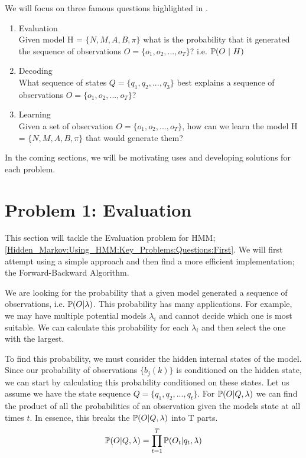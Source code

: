     We will focus on three famous questions highlighted in  \cite{Rabiner1986}. 
    \begin{enumerate}
        \label{Hidden_Markov:Using_HMM:Key_Problems:Questions}
        \item \label{Hidden_Markov:Using_HMM:Key_Problems:Questions:First} Evaluation \\ Given model H = $\{N,M,A,B, \pi\}$ what is the probability that it generated the sequence of observations $O = \{o_1,o_2,...,o_T\}$? i.e. $\mathbb{P} (O \ | \ H)$
        \item \label{Hidden_Markov:Using_HMM:Key_Problems:Questions:Second} Decoding \\ What sequence of states $Q = \{q_1, q_2,..., q_3\}$ best explains a sequence of observations $O  = \{o_1,o_2,...,o_T\}$?
        \item \label{Hidden_Markov:Using_HMM:Key_Problems:Questions:Third} Learning \\ Given a set of observation $O =   \{o_1,o_2,...,o_T\}$, how can we learn the model H = $\{N,M,A,B,  \pi\}$ that would generate them?
    \end{enumerate}
    
    In the coming sections, we will be motivating uses and developing solutions for each problem. 


\section{Problem 1: Evaluation}
\label{Hidden_Markov:Evaluation}

This section will tackle the Evaluation problem for HMM; \ref{Hidden_Markov:Using_HMM:Key_Problems:Questions:First}. We will first attempt using a simple approach and then find a more efficient implementation; the Forward-Backward Algorithm.

We are looking for the probability that a given model generated a sequence of observations, i.e. $\mathbb{P} (O | \lambda)$. This probability has many applications. For example, we may have multiple potential models $\lambda_i$ and cannot decide which one is most suitable. We can calculate this probability for each $\lambda_i$ and then select the one with the largest.

To find this probability, we must consider the hidden internal states of the model. Since our probability of observations $\{b_j(k)\}$ is conditioned on the hidden state, we can start by calculating this probability conditioned on these states. Let us assume we have the state sequence $Q = \{q_1,q_2,...,q_t\}$. For $\mathbb{P} (O | Q, \lambda)$ we can find the product of all the probabilities of an observation given the models state at all times $t$. In essence, this breaks the  $\mathbb{P} (O | Q, \lambda)$ into T parts. 
\begin{equation}
    \label{Hidden_Markov:Evaluation:Equation1}
    \mathbb{P} (O | Q, \lambda) = \prod_{t=1}^T \mathbb{P} (O_t | q_t, \lambda)
\end{equation}


